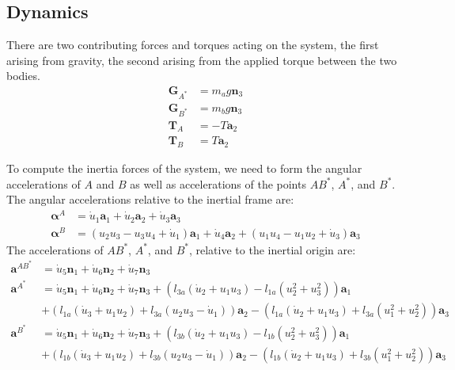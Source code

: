 \documentclass[letterpaper,11pt]{article}
\newcommand{\bs}[1]{ \boldsymbol{ #1 } }
\begin{document}
\subsection*{Dynamics}
There are two contributing forces and torques acting on the system, the first
arising from gravity, the second arising from the applied torque between the
two bodies.
\begin{align*}
  \bs{G}_{A^*} & = m_ag\bs{n}_3 \\
  \bs{G}_{B^*} & = m_bg\bs{n}_3 \\
  \bs{T}_A & = - T \bs{a}_2 \\
  \bs{T}_B & = T \bs{a}_2
\end{align*}

To compute the inertia forces of the system, we need to form the
angular accelerations of $A$ and $B$ as well as accelerations of the points
$AB^*$, $A^*$, and $B^*$. The angular accelerations relative to the inertial
frame are:
\begin{align*}
  \bs{\alpha}^A & = \dot{u}_1 \bs{a}_1 + \dot{u}_2 \bs{a}_2 + \dot{u}_3 \bs{a}_3\\
  \bs{\alpha}^B & =(u_2u_3 - u_3u_4 + \dot{u}_1)\bs{a}_1 + \dot{u}_4\bs{a}_2 + (u_1u_4 -
  u_1u_2 + \dot{u}_3)\bs{a}_3
\end{align*}
The accelerations of $AB^*$, $A^*$, and $B^*$, relative to the inertial
origin are:
\begin{align*}
  \bs{a}^{AB^*} &= \dot{u}_5\bs{n}_1 + \dot{u}_6\bs{n}_2 + \dot{u}_7\bs{n}_3
  \\
  \bs{a}^{A^*} &= \dot{u}_5\bs{n}_1 + \dot{u}_6\bs{n}_2 + \dot{u}_7\bs{n}_3
  + (l_{3a}(\dot{u}_2 + u_1u_3) - l_{1a}(u_2^2 + u_3^2))\bs{a}_1 \\
  &+ (l_{1a}(\dot{u}_3 + u_1u_2) + l_{3a}(u_2u_3 - \dot{u}_1))\bs{a}_2
  - (l_{1a}(\dot{u}_2 + u_1u_3) + l_{3a}(u_1^2 + u_2^2))\bs{a}_3
  \\
  \bs{a}^{B^*} &= \dot{u}_5\bs{n}_1 + \dot{u}_6\bs{n}_2 + \dot{u}_7\bs{n}_3
  + (l_{3b}(\dot{u}_2 + u_1u_3) - l_{1b}(u_2^2 + u_3^2))\bs{a}_1 \\
  &+ (l_{1b}(\dot{u}_3 + u_1u_2) + l_{3b}(u_2u_3 - \dot{u}_1))\bs{a}_2
  - (l_{1b}(\dot{u}_2 + u_1u_3) + l_{3b}(u_1^2 + u_2^2))\bs{a}_3
\end{align*}
\end{document}

